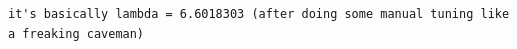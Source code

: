 \documentclass[10pt,a4paper]{article}
\begin{document}
\begin{verbatim}
it's basically lambda = 6.6018303 (after doing some manual tuning like a freaking caveman)
\end{verbatim}
\end{document}
